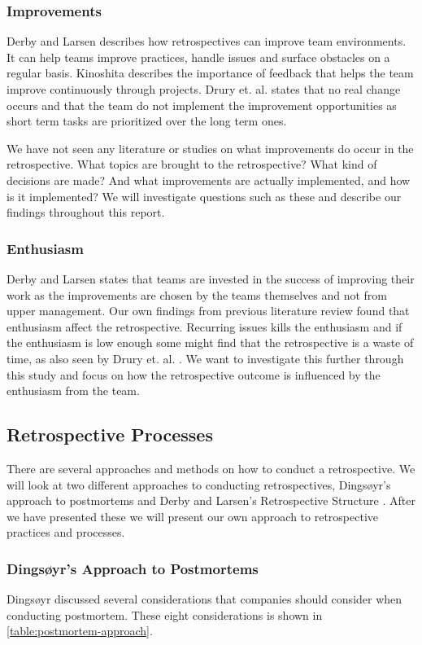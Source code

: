 \subsubsection{Improvements}
Derby and Larsen \cite{Larsen2006} describes how retrospectives can improve team environments. It can help teams improve practices, handle issues and surface obstacles on a regular basis. Kinoshita \cite{Kinoshita2008} describes the importance of feedback that helps the team improve continuously through projects. Drury et. al. \cite{Drury2012} states that no real change occurs and that the team do not implement the improvement opportunities as short term tasks are prioritized over the long term ones. 

We have not seen any literature or studies on what improvements do occur in the retrospective. What topics are brought to the retrospective? What kind of decisions are made? And what improvements are actually implemented, and how is it implemented? We will investigate questions such as these and describe our findings throughout this report.

\subsubsection{Enthusiasm}
Derby and Larsen \cite{Larsen2006} states that teams are invested in the success of improving their work as the improvements are chosen by the teams themselves and not from upper management. Our own findings \cite{Dolvik2014} from previous literature review found that enthusiasm affect the retrospective. Recurring issues kills the enthusiasm and if the enthusiasm is low enough some might find that the retrospective is a waste of time, as also seen by Drury et. al. \cite{Drury2012}. We want to investigate this further through this study and focus on how the retrospective outcome is influenced by the enthusiasm from the team. 

\subsection{Retrospective Processes}
There are several approaches and methods on how to conduct a retrospective. We will look at two different approaches to conducting retrospectives, Dingsøyr's \cite{Dingsoyr2004} approach to postmortems and Derby and Larsen's Retrospective Structure \cite{Larsen2006}. After we have presented these we will present our own approach to retrospective practices and processes. 

\subsubsection{Dingsøyr's Approach to Postmortems}
\label{section:Dingsoyr-Approach-Introduction}
Dingsøyr \cite{Dingsoyr2004} discussed several considerations that companies should consider when conducting postmortem. These eight considerations is shown in \autoref{table:postmortem-approach}. 

